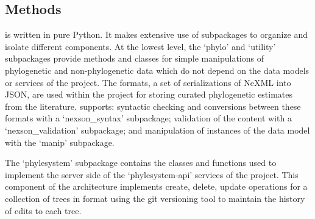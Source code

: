 \begin{methods}
\section{Methods}
\Pey is written in pure Python.
It makes extensive use of subpackages to organize and isolate different components.
At the lowest level, the `phylo' and `utility' subpackages provide methods and classes
    for simple manipulations of phylogenetic and non-phylogenetic data which do not
    depend on the data models or services of the \otol project.
The \nexson  formats\citep{NexSON}, a set of serializations of NeXML \citep{NeXML} into JSON, are used
    within the project for storing curated phylogenetic estimates from the literature.
\Pey supports: syntactic checking and conversions between these formats with a `nexson\_syntax'
    subpackage;
    validation of the content with a `nexson\_validation' subpackage; and 
    manipulation of instances of the \nexson data model with the `manip' subpackage.

The `phylesystem' subpackage contains the classes and functions used to implement the
    server side of the `phylesystem-api' services of the \otol project.
This component of the architecture \citep[described in more detail in][]{phylesystemapi}
    implements create, delete, update operations for a collection of trees in \nexson
    format using the git versioning tool to maintain the history of edits to each
    tree.


\end{methods}
